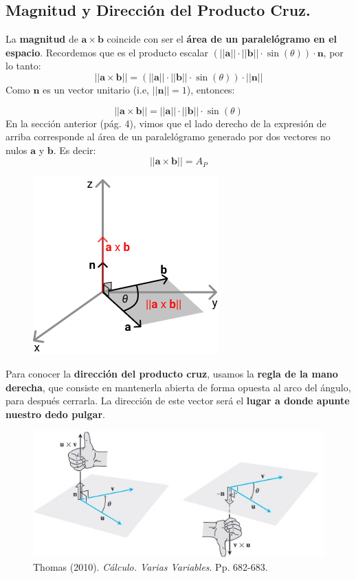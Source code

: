 \documentclass[12pt]{article}
\begin{document}
\subsection{Magnitud y Dirección del Producto Cruz.}

La \textbf{magnitud} de $\mathbf{a} \times \mathbf{b}$ coincide con ser el \textbf{área de un paralelógramo en el espacio}. Recordemos que es el producto escalar $(||\mathbf{a}|| \cdot ||\mathbf{b}|| \cdot \sin(\theta)) \cdot \mathbf{n}$, por lo tanto:
\[
  ||\mathbf{a} \times \mathbf{b}|| = (||\mathbf{a}|| \cdot ||\mathbf{b}|| \cdot \sin(\theta)) \cdot ||\mathbf{n}||
\]
Como $\mathbf{n}$ es un vector unitario (i.e, $||\mathbf{n}|| = 1$), entonces:

\[
  ||\mathbf{a} \times \mathbf{b}|| = ||\mathbf{a}|| \cdot ||\mathbf{b}|| \cdot \sin(\theta)
\]
En la sección anterior (pág. 4), vimos que el lado derecho de la expresión de arriba corresponde al área de un paralelógramo generado por dos vectores no nulos $\mathbf{a}$ y $\mathbf{b}$. Es decir:
\[
  ||\mathbf{a} \times \mathbf{b}|| = A_{P}
\]

\begin{figure}[hbt!]
\centering
\includegraphics[scale=0.6]{img/cross-product-2.jpg}
\end{figure}

Para conocer la \textbf{dirección del producto cruz}, usamos la \textbf{regla de la mano derecha}, que consiste en mantenerla abierta de forma opuesta al arco del ángulo, para después cerrarla. La dirección de este vector será el \textbf{lugar a donde apunte nuestro dedo pulgar}.

\begin{figure}[hbt!]
\centering
\includegraphics[scale=0.75]{img/right-hand-rule.jpg}
\caption{Thomas (2010). \textit{Cálculo. Varias Variables}. Pp. 682-683.}
\end{figure}
\end{document}

